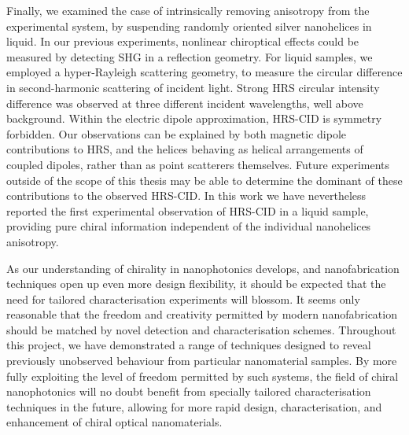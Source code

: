 Finally, we examined the case of intrinsically removing anisotropy from the experimental system, by suspending randomly oriented silver nanohelices in liquid. In our previous experiments, nonlinear chiroptical effects could be measured by detecting SHG in a reflection geometry. For liquid samples, we employed a hyper-Rayleigh scattering geometry, to measure the circular difference in second-harmonic scattering of incident light. Strong HRS circular intensity difference was observed at three different incident wavelengths, well above background. Within the electric dipole approximation, HRS-CID is symmetry forbidden. Our observations can be explained by both magnetic dipole contributions to HRS, and the helices behaving as helical arrangements of coupled dipoles, rather than as point scatterers themselves. Future experiments outside of the scope of this thesis may be able to determine the dominant of these contributions to the observed HRS-CID. In this work we have nevertheless reported the first experimental observation of HRS-CID in a liquid sample, providing pure chiral information independent of the individual nanohelices anisotropy.

As our understanding of chirality in nanophotonics develops, and nanofabrication techniques open up even more design flexibility, it should be expected that the need for tailored characterisation experiments will blossom. It seems only reasonable that the freedom and creativity permitted by modern nanofabrication should be matched by novel detection and characterisation schemes. Throughout this project, we have demonstrated a range of techniques designed to reveal previously unobserved behaviour from particular nanomaterial samples. By more fully exploiting the level of freedom permitted by such systems, the field of chiral nanophotonics will no doubt benefit from specially tailored characterisation techniques in the future, allowing for more rapid design, characterisation, and enhancement of chiral optical nanomaterials.
